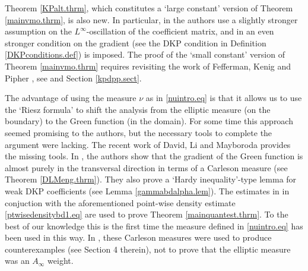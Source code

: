 \documentclass[11pt, a4paper,leqno]{amsart}
\theoremstyle{plain}
\theoremstyle{definition}
\theoremstyle{remark}
\numberwithin{equation}{section}
\begin{document}
Theorem \ref{KPalt.thrm}, which constitutes a `large constant' version of Theorem \ref{mainvmo.thrm}, is also new. In particular, in \cite{DPP} the authors use a slightly stronger assumption on the $L^\infty$-oscillation of the coefficient matrix, and in \cite{KP} an even stronger condition on the gradient (see the DKP condition in Definition \eqref{DKPconditions.def}) is imposed. 
The proof of the `small constant' version of Theorem \ref{mainvmo.thrm} requires revisiting the work of Fefferman, Kenig and Pipher \cite{FKP}, see \cite{BES} and Section \ref{kpdpp.sect}.



The advantage of using the measure $\nu$ as in \eqref{nuintro.eq} is that it allows us to use the `Riesz formula' to shift the analysis from the elliptic measure (on the boundary) to the Green function (in the domain). For some time this approach seemed promising to the authors, but the necessary tools to complete the argument were lacking. 
The recent work of David, Li and Mayboroda \cite{DLM} provides the missing tools. In \cite{DLM}, the authors show that the gradient of the Green function is almost purely in the transversal direction in terms of a Carleson measure (see Theorem \ref{DLMeng.thrm}). They also prove a `Hardy inequality'-type lemma for weak DKP coefficients (see Lemma \ref{gammabdalpha.lem}). The estimates in \cite{DLM} in conjuction with the aforementioned point-wise density estimate \eqref{ptwisedensitybd1.eq} are used to prove Theorem \ref{mainquantest.thrm}. To the best of our knowledge this is the first time the measure defined in \eqref{nuintro.eq} has been used in this way. In \cite{FKP}, these Carleson measures were used to produce counterexamples (see Section 4 therein), not to prove that the elliptic measure was an $A_\infty$ weight. 
\end{document}
